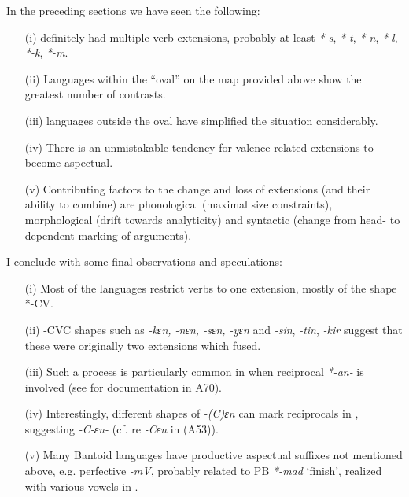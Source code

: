 \documentclass[output=paper]{langsci/langscibook}
\begin{document}
In the preceding sections we have seen the following: 
\begin{itemize}
\item[(i)]   definitely had multiple verb extensions, probably at least \textit{*-s}, \textit{*-t}, \textit{*-n}, \textit{*-l}, \textit{*-k}, \textit{*-m}. 
\item[(ii)] Languages within the “oval” on the map provided above show the greatest number of contrasts. 
\item[(iii)]  languages outside the oval have simplified the situation considerably. 
\item[(iv)] There is an unmistakable tendency for valence-related extensions to become aspectual. 
\item[(v)] Contributing factors to the change and loss of extensions (and their ability to combine) are phonological (maximal size constraints), morphological (drift towards analyticity) and syntactic (change from head- to dependent-marking of arguments).
\end{itemize}

I conclude with some final observations and speculations:   
\begin{itemize}
\item[(i)]  Most of the  languages restrict verbs to one extension, mostly of the shape *-CV. 
\item[(ii)] -CVC shapes such as  \textit{-kɛn, -nɛn, -sɛn, -yɛn} and  \textit{-sin}, \textit{-tin}, \textit{-kir} suggest that these were originally two extensions which fused. 
\item[(iii)] Such a process is particularly common in  when  reciprocal \textit{*-an-} is involved (see \citealt{BostoenNzangBie2010} for documentation in A70). 
\item[(iv)] Interestingly, different shapes of \textit{-(C)ɛn} can mark reciprocals in  \citep[39-40]{Hyman1981}, suggesting \textit{-C-ɛn-} (cf. \citealt[62ff]{Guarisma2000} re \textit{-Cɛn} in  (A53)). 
\item[(v)] Many Bantoid languages have productive aspectual suffixes not mentioned above, e.g. perfective \textit{-mV}, probably related to PB \textit{*-mad} ‘finish’, realized with various vowels in .
\end{itemize}
\end{document}
